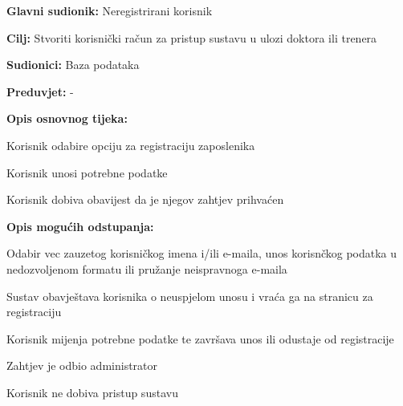 					\noindent {}
					\begin{packed_item}
						
						\item \textbf{Glavni sudionik:} Neregistrirani korisnik
						\item  \textbf{Cilj:} Stvoriti korisnički račun za pristup sustavu u ulozi doktora ili trenera
						\item  \textbf{Sudionici:} Baza podataka
						\item  \textbf{Preduvjet:} -
						\item  \textbf{Opis osnovnog tijeka:}
						
						\item[] \begin{packed_enum}
							
							\item Korisnik odabire opciju za registraciju zaposlenika
							\item Korisnik unosi potrebne podatke
							\item Korisnik dobiva obavijest da je njegov zahtjev prihvaćen
						\end{packed_enum}
						
						\item  \textbf{Opis mogućih odstupanja:}
						
						\item[] \begin{packed_item}
							
							\item[2.a] Odabir vec zauzetog korisničkog imena i/ili e-maila, unos korisnčkog podatka u nedozvoljenom formatu ili pružanje neispravnoga e-maila
							\item[] \begin{packed_enum}
								
								\item Sustav obavještava korisnika o neuspjelom unosu i vraća ga na stranicu za registraciju
								\item Korisnik mijenja potrebne podatke te završava unos ili odustaje od registracije
								
							\end{packed_enum}
						
							\item[3.a] Zahtjev je odbio administrator
							\item [] \begin{packed_enum}
								
								\item Korisnik ne dobiva pristup sustavu 
							
							\end{packed_enum}
						\end{packed_item}
					\end{packed_item}
				
